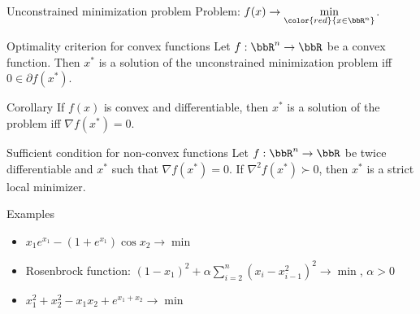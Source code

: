 \documentclass[12pt]{beamer}
\begin{document}
\begin{frame}{Unconstrained minimization problem}
Problem: $f(x) \rightarrow \min\limits_{\color{red}{x \in \bbR^n}}$.

\begin{block}{Optimality criterion for convex functions}
Let $f: \bbR^n \to \bbR$ be a convex function.
Then $x^*$ is a solution of the unconstrained minimization problem iff $0 \in \partial f(x^*)$.
\end{block}

\begin{block}{Corollary}
If $f(x)$ is convex and differentiable, then $x^*$ is a solution of the problem iff $\nabla f(x^*) = 0$.
\end{block}

\begin{block}{Sufficient condition for non-convex functions}
Let $f: \bbR^n \to \bbR$ be twice differentiable and $x^*$ such that $\nabla f(x^*) = 0$. 
If  $\nabla^2 f(x^*) \succ 0$, then $x^*$ is a strict local minimizer.  
\end{block}

\end{frame}

\begin{frame}{Examples}
\begin{itemize}
\item $x_1e^{x_1} - (1 + e^{x_1})\cos x_2 \rightarrow \min$
\item Rosenbrock function: $(1 - x_1)^2 + \alpha \sum\limits_{i = 2}^n (x_i - x^2_{i-1})^2 \rightarrow \min$, $\alpha > 0$
\item $x^2_1 + x^2_2 - x_1x_2 + e^{x_1 + x_2} \rightarrow \min$
\end{itemize}
\end{frame}
\end{document}
